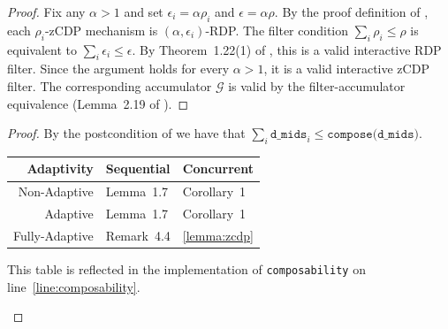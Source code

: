 \documentclass{article}
\begin{document}
\begin{proof}
  Fix any $\alpha>1$ and set $\epsilon_i=\alpha\rho_i$ and $\epsilon=\alpha\rho$.
  By the proof definition of , each $\rho_i$-zCDP mechanism is $(\alpha,\epsilon_i)$-RDP.
  The filter condition $\sum_i\rho_i\leq\rho$ is equivalent to $\sum_i\epsilon_i\leq\epsilon$.
  By Theorem~1.22(1) of \cite{haney2025concurrent}, this is a valid interactive RDP filter.
  Since the argument holds for every $\alpha>1$, it is a valid interactive zCDP filter.
  The corresponding accumulator $\mathcal{G}$ is valid by the filter-accumulator equivalence (Lemma~2.19 of \cite{haney2025concurrent}).
\end{proof}

\begin{proof}
  By the postcondition of  we have that $\sum_i \texttt{d\_mids}_i \le \texttt{compose(d\_mids)}$.

  \begin{center}
    \begin{tabular}{ r | l l }
      Adaptivity & Sequential & Concurrent \\
      \hline
      Non-Adaptive & Lemma~1.7\cite{bun2016concentrated} & Corollary~1\cite{lyu2022interactive} \\
      Adaptive & Lemma~1.7\cite{bun2016concentrated} & Corollary~1\cite{lyu2022interactive} \\
      Fully-Adaptive & Remark~4.4\cite{feldman2022individual} & \ref{lemma:zcdp}
    \end{tabular}

    This table is reflected in the implementation of \texttt{composability} on line~\ref{line:composability}.
  \end{center}

\end{proof}



\end{document}
